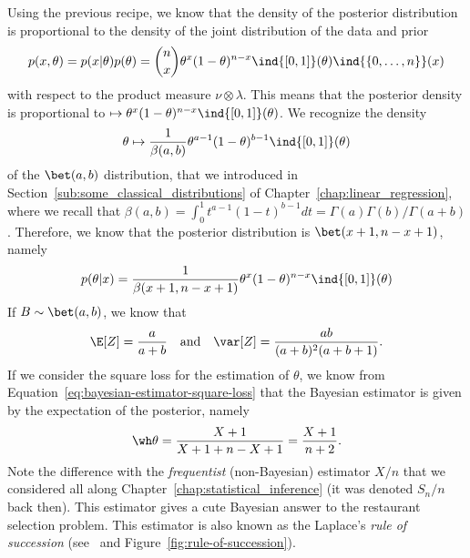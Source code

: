 Using the previous recipe, we know that the density of the posterior distribution is proportional to the density of the joint distribution of the data and prior
\begin{equation*}{}
	p(x, \theta) = p(x | \theta) p(\theta) = \binom{n}{x} \theta^x (1 - \theta)^{n - x} \ind{[0, 1]}(\theta) \ind{\{ 0, \ldots, n\}}(x)
\end{equation*}
with respect to the product measure $\nu \otimes \lambda$.
This means that the posterior density is proportional to $\mapsto \theta^x (1 - \theta)^{n - x} \ind{[0, 1]}(\theta)$. 
We recognize the density
\begin{equation*}
	\theta \mapsto \frac{1}{\beta(a, b)} \theta^{a-1} (1 - \theta)^{b-1} \ind{[0, 1]}(\theta)
\end{equation*}
 of the $\bet(a, b)$ distribution, that we introduced in Section~\ref{sub:some_classical_distributions} of Chapter~\ref{chap:linear_regression},
where we recall that $\beta(a, b) = \int_0^1 t^{a-1} (1 - t)^{b-1} d t = \Gamma(a) \Gamma(b)  / \Gamma(a + b)$.
Therefore, we know that the posterior distribution is $\bet(x + 1, n - x + 1)$, namely
\begin{equation*}
	p(\theta | x) = \frac{1}{\beta(x + 1, n - x + 1)} \theta^{x} (1 - \theta)^{n-x} \ind{[0, 1]}(\theta)
\end{equation*}
If $B \sim \bet(a, b)$, we know that
\begin{equation*}
	\E[Z] = \frac{a}{a + b} \quad \text{and} \quad \var[Z] = \frac{ab}{(a + b)^2 (a + b + 1)}.
\end{equation*}
If we consider the square loss for the estimation of $\theta$, we know from Equation~\eqref{eq:bayesian-estimator-square-loss} that the Bayesian estimator is given by the expectation of the posterior, namely
\begin{equation*}
	\wh \theta = \frac{X + 1}{X + 1 + n - X + 1} = \frac{X + 1}{n + 2}.
\end{equation*}
Note the difference with the \emph{frequentist} (non-Bayesian) estimator $X / n$ that we considered all along Chapter~\ref{chap:statistical_inference} (it was denoted $S_n / n$ back then).
This estimator gives a cute Bayesian answer to the restaurant selection problem.
This estimator is also known as the Laplace's \emph{rule of succession} (see~ and Figure~\ref{fig:rule-of-succession}).
